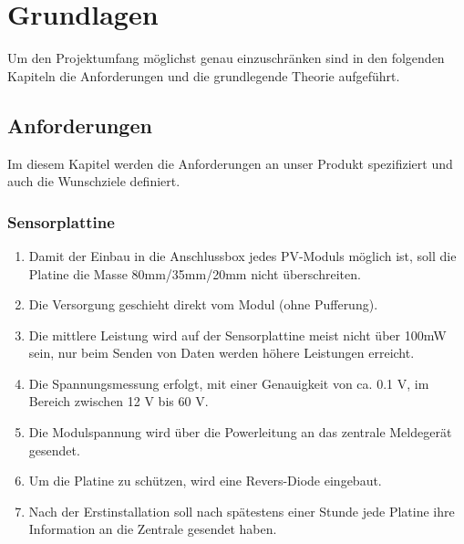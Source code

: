 \section{Grundlagen}
Um den Projektumfang möglichst genau einzuschränken sind in den folgenden Kapiteln die Anforderungen und die grundlegende Theorie aufgeführt.
\subsection{Anforderungen}
\label{Anforderungen}
Im diesem Kapitel werden die Anforderungen an unser Produkt spezifiziert und auch die Wunschziele definiert.
\subsubsection{Sensorplattine}
\begin{enumerate}
\item Damit der Einbau in die Anschlussbox jedes PV-Moduls möglich ist, soll die Platine die Masse 80mm/35mm/20mm nicht überschreiten.
\item Die Versorgung geschieht direkt vom Modul (ohne Pufferung).
\item Die mittlere Leistung wird auf der Sensorplattine meist nicht über 100mW sein, nur beim Senden von Daten werden höhere Leistungen erreicht.
\item	Die Spannungsmessung erfolgt, mit einer Genauigkeit von ca. 0.1 V, im Bereich zwischen 12 V bis 60 V.
\item	Die Modulspannung wird über die Powerleitung an das zentrale Meldegerät gesendet.
\item Um die Platine zu schützen, wird eine Revers-Diode eingebaut.
\item Nach der Erstinstallation soll nach spätestens einer Stunde jede Platine ihre Information an die Zentrale gesendet haben.
\end{enumerate}

